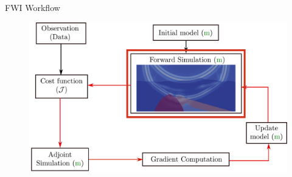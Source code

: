 \begin{frame}[noframenumbering]{FWI Workflow}
\begin{figure}
  \includegraphics[scale=0.31]{image/fwi_workflow_red.pdf}
\end{figure}
\end{frame}
